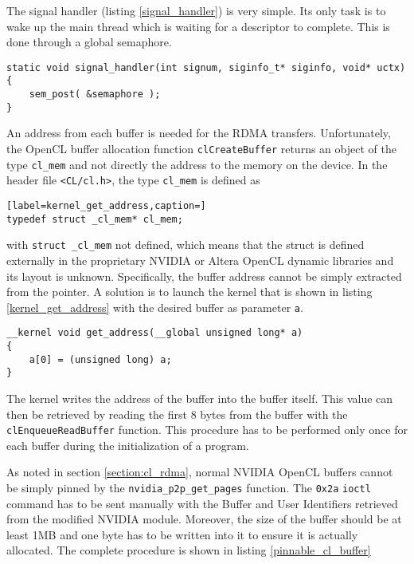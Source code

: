 The signal handler (listing \ref{signal_handler}) is very simple.
Its only task is to wake up the main thread which is waiting for a descriptor to complete.
This is done through a global semaphore.

\begin{lstlisting}[label=signal_handler,caption=Signal handler function]
static void signal_handler(int signum, siginfo_t* siginfo, void* uctx)
{
	sem_post( &semaphore );
}
\end{lstlisting}





\label{section:get_address}

An address from each buffer is needed for the RDMA transfers. Unfortunately, the OpenCL buffer allocation function \texttt{clCreateBuffer} returns an object of the type \texttt{cl\_mem} and not directly the address to the memory on the device.
In the header file \texttt{<CL/cl.h>}, the type \texttt{cl\_mem} is defined as
\begin{lstlisting}[label=kernel_get_address,caption=]
typedef struct _cl_mem* cl_mem;
\end{lstlisting}
with \texttt{struct \_cl\_mem} not defined, which means that the struct is defined externally in the proprietary NVIDIA or Altera OpenCL dynamic libraries and its layout is unknown.
Specifically, the buffer address cannot be simply extracted from the pointer.
A solution is to launch the kernel that is shown in listing \ref{kernel_get_address} with the desired buffer as parameter \texttt{a}.

\begin{lstlisting}[label=kernel_get_address,caption=OpenCL C kernel to retrieve the address from a \texttt{cl\_mem} object]
__kernel void get_address(__global unsigned long* a)
{
	a[0] = (unsigned long) a;
}
\end{lstlisting}

The kernel writes the address of the buffer into the buffer itself.
This value can then be retrieved by reading the first 8 bytes from the buffer with the \texttt{clEnqueueReadBuffer} function.
This procedure has to be performed only once for each buffer during the initialization of a program.


As noted in section \ref{section:cl_rdma}, normal NVIDIA OpenCL buffers cannot be simply pinned by the \texttt{nvidia\_p2p\_get\_pages} function.
The \texttt{0x2a} \texttt{ioctl} command has to be sent manually with the Buffer and User Identifiers retrieved from the modified NVIDIA module.
Moreover, the size of the buffer should be at least 1MB and one byte has to be written into it to ensure it is actually allocated.
The complete procedure is shown in listing \ref{pinnable_cl_buffer}

